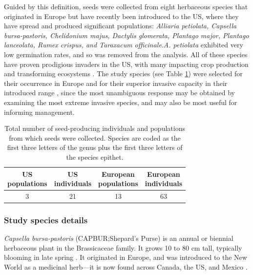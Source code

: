 \documentclass[12pt]{article}\usepackage[]{graphicx}\usepackage[]{color}
\begin{document}
	Guided by this definition, seeds were collected from eight herbaceous species that originated in Europe but have recently been introduced to the US, where they have spread and produced significant populations:\textit{ Alliaria petiolata, Capsella bursa-pastoris, Chelidonium majus, Dactylis glomerata, Plantago major, Plantago lanceolata, Rumex crispus, and Taraxacum officinale}.\textit{A. petiolata} exhibited very low germination rates, and so was removed from the analysis.  All of these species have proven prodigious invaders in the US, with many impacting crop production and transforming ecosystems \parencite[e.g.,][]{Froese2003,Wolfe2008}. The study species (see Table \ref{tab:seeds}) were selected for their occurrence in Europe and for their superior invasive capacity in their introduced range \parencite{Uva1997}, since the most unambiguous response may be obtained by examining the most extreme invasive species, and may also be most useful for informing management. 
	\begin{center}
		\begin{table}
			\centering
			\caption {Total number of seed-producing individuals and populations from which seeds were collected. Species are coded as the first three letters of the genus plus the first three letters of the species epithet.} \label{tab:seeds}  
			\begin{tabular}{|c|c|c|c|}
				\hline 
				\makecell{\textbf{US} \\ \textbf{populations}} & \makecell{\textbf{US} \\  \textbf{individuals}} & \makecell{\textbf{European} \\ \textbf{populations}} & \makecell{\textbf{European} \\ \textbf{individuals}} \\
				\hline
				3&	21&	13&	63\\
				\hline
			\end{tabular}
		\end{table}
	\end{center}
	\subsubsection{Study species details}
	\textit{Capsella bursa-pastoris} (CAPBUR;Shepard’s Purse) is an annual or biennial herbaceous plant in the Brassicaceae family. It grows 10 to 80 cm tall, typically blooming in late spring \parencite{Defelice2001}. It originated in Europe, and was introduced to the New World as a medicinal herb---it is now found across Canada, the US, and Mexico \parencite{Westrich1989}.
	
\end{document}
